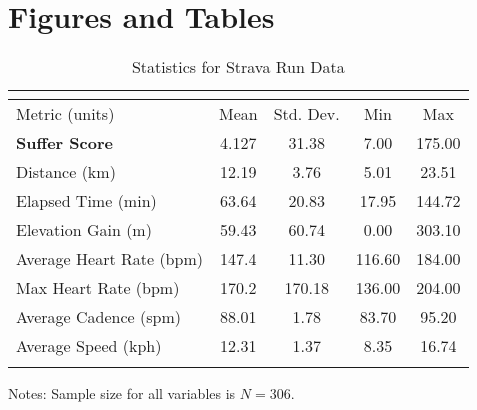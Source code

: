 \documentclass[12pt,english]{article}
\begin{document}
\section*{Figures and Tables}\label{sec:figTables}

\begin{table}[ht]
\caption{Statistics for Strava Run Data}
\label{tab:descriptives} 
\centering
\begin{threeparttable}
\begin{tabular}{lcccc}
\multicolumn{5}{l}{}\\
\toprule
Metric (units)        & Mean  & Std. Dev. & Min   & Max   \\
\midrule
\textbf{Suffer Score}    & 4.127 & 31.38     & 7.00 & 175.00 \\
Distance (km)            & 12.19 & 3.76      & 5.01 & 23.51 \\
Elapsed Time (min)       & 63.64 & 20.83     & 17.95 & 144.72 \\
Elevation Gain (m)       & 59.43 & 60.74     & 0.00 & 303.10 \\
Average Heart Rate (bpm) & 147.4 & 11.30     & 116.60 & 184.00 \\
Max Heart Rate (bpm)     & 170.2 & 170.18    & 136.00 & 204.00 \\
Average Cadence (spm)    & 88.01 & 1.78      & 83.70 & 95.20 \\
Average Speed (kph)      & 12.31 & 1.37      & 8.35 & 16.74 \\
&&&&\\
\bottomrule
\end{tabular}
\footnotesize Notes: Sample size for all variables is $N=306$.
\end{threeparttable}
\end{table}
\end{document}
